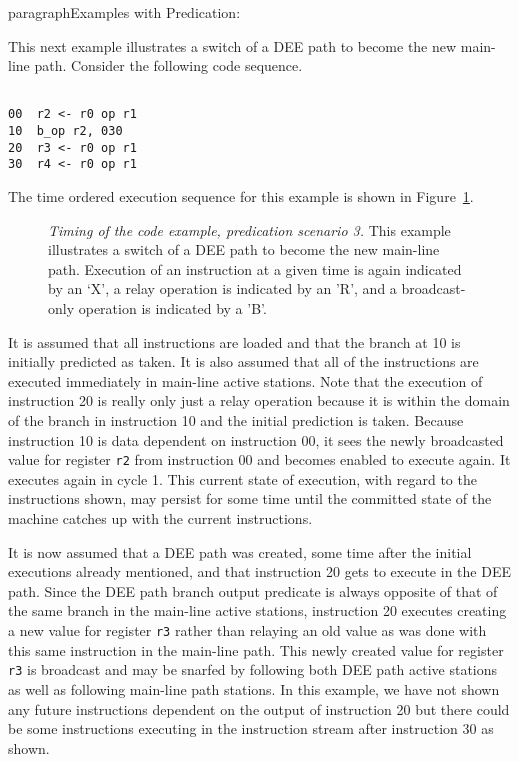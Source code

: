 paragraph{Examples with Predication: }

This next example illustrates a switch of a DEE path to become
the new main-line path.
Consider the following code sequence.

\begin{verbatim}

00	r2 <- r0 op r1
10	b_op r2, 030
20	r3 <- r0 op r1
30	r4 <- r0 op r1

\end{verbatim}

The time ordered execution sequence for this example is shown in
Figure~\ref{pex3}.

\begin{figure}
\centering
{}
\caption{{\em Timing of the code example, predication scenario 3.}
This example illustrates a switch of a DEE path to
become the new main-line path.
Execution of an instruction at a given time is
again indicated by an `X', a relay operation is indicated by an 'R',
and a broadcast-only operation is indicated by a 'B'.}
\label{pex3}
\end{figure}

It is assumed that all instructions are loaded and that
the branch at 10 is initially predicted as taken.
It is also assumed that all of the instructions are
executed immediately in main-line active stations.
Note that the execution of instruction 20 is really only
just a relay operation because it is within the domain of the branch 
in instruction 10 and the initial prediction is taken.
Because instruction 10 is data dependent on instruction 00, it
sees the newly broadcasted value
for register
{\tt r2}
from instruction 00 and becomes enabled to execute again.
It executes again in cycle 1.
This current state of execution, with regard to the instructions
shown, may persist for some time until the committed state of
the machine catches up with the current instructions.

It is now assumed that a DEE path was created, some time
after the initial executions already mentioned, and that
instruction 20 gets to execute in the DEE path.  Since
the DEE path branch output predicate is always opposite of
that of the same branch in the main-line active stations,
instruction 20 executes creating a new value for
register
{\tt r3}
rather than relaying an old value as was done with this
same instruction in the main-line path.
This newly created value for register
{\tt r3}
is broadcast and may be snarfed by following both DEE path
active stations as well as following main-line path stations.
In this example, we have not shown any future instructions
dependent on the output of instruction 20 but there could be
some instructions executing in the instruction stream after instruction 30
as shown.

